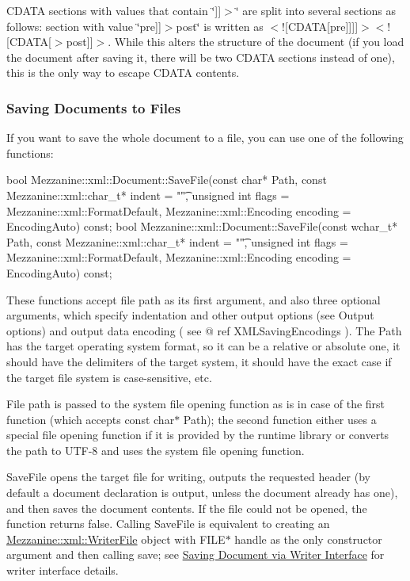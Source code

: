  CDATA sections with values that contain \char`\"{}\mbox{]}\mbox{]}$>$\char`\"{} are split into several sections as follows: section with value \char`\"{}pre\mbox{]}\mbox{]}$>$post\char`\"{} is written as $<$!\mbox{[}CDATA\mbox{[}pre\mbox{]}\mbox{]}\mbox{]}\mbox{]}$>$$<$!\mbox{[}CDATA\mbox{[}$>$post\mbox{]}\mbox{]}$>$. While this alters the structure of the document (if you load the document after saving it, there will be two CDATA sections instead of one), this is the only way to escape CDATA contents. \hypertarget{XMLManual_XMLSavingFile}{}\subsubsection{Saving Documents to Files}\label{XMLManual_XMLSavingFile}
If you want to save the whole document to a file, you can use one of the following functions: 
\begin{DoxyCode}
 bool Mezzanine::xml::Document::SaveFile(const char* Path, const 
      Mezzanine::xml::char_t* indent = "\t", unsigned int flags = 
      Mezzanine::xml::FormatDefault, Mezzanine::xml::Encoding encoding = EncodingAuto) 
      const;
 bool Mezzanine::xml::Document::SaveFile(const wchar_t* Path, const 
      Mezzanine::xml::char_t* indent = "\t", unsigned int flags = 
      Mezzanine::xml::FormatDefault, Mezzanine::xml::Encoding encoding = EncodingAuto) 
      const;
\end{DoxyCode}
 These functions accept file path as its first argument, and also three optional arguments, which specify indentation and other output options (see Output options) and output data encoding ( see @ ref XMLSavingEncodings ). The Path has the target operating system format, so it can be a relative or absolute one, it should have the delimiters of the target system, it should have the exact case if the target file system is case-\/sensitive, etc. \par
 \par
 File path is passed to the system file opening function as is in case of the first function (which accepts const char$\ast$ Path); the second function either uses a special file opening function if it is provided by the runtime library or converts the path to UTF-\/8 and uses the system file opening function. \par
 \par
 SaveFile opens the target file for writing, outputs the requested header (by default a document declaration is output, unless the document already has one), and then saves the document contents. If the file could not be opened, the function returns false. Calling SaveFile is equivalent to creating an \hyperlink{classMezzanine_1_1xml_1_1WriterFile}{Mezzanine::xml::WriterFile} object with FILE$\ast$ handle as the only constructor argument and then calling save; see \hyperlink{XMLManual_XMLSavingWriter}{Saving Document via Writer Interface} for writer interface details. \par
$$

